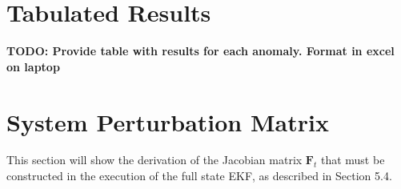 \chapter{Tabulated Results}
\makeatletter{}\makeatother
\label{appen:Tabulated_Results}
\textbf{TODO: Provide table with results for each anomaly. Format in excel on laptop}

\chapter{System Perturbation Matrix}
\makeatletter{}\makeatother
\label{appen:SystemPerturbationMatrix}
\cite{JansevanVuuren2015}
This section will show the derivation of the Jacobian matrix $\mathbf{F}_{t}$ that must be constructed in the execution of the full state EKF, as described in Section 5.4.

